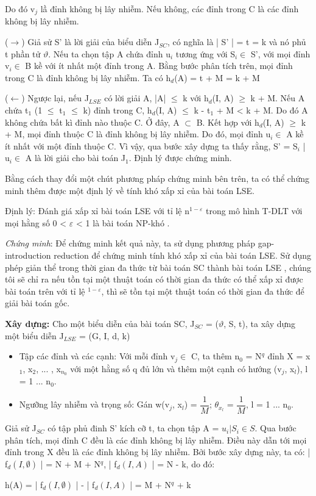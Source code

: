  		Do đó v$_{j}$ lầ đỉnh không bị lây nhiễm. Nếu không, các đỉnh trong C là các đỉnh không bị lây nhiễm.
 		
 		($\rightarrow$) Giả sử S' là lời giải của biểu diễn J$_{SC}$, có nghĩa là | S' | = t = k và nó phủ t phần tử $\vartheta$. Nếu ta chọn tập A chứa đỉnh u$_{i}$ tương ứng với S$_{i} \in$ S', với mọi đỉnh v$_{i} \in$ B kề với ít nhất một đỉnh trong A. Bằng bước phân tích trên, mọi đỉnh trong C là đỉnh không bị lây nhiễm. Ta có h$_{d}$(A) = t + M = k + M
 		
 		($\leftarrow$) Ngược lại, nếu J$_{LSE}$ có lời giải A, |A| $\leq$ k với h$_{d}$(I, A) $\geq$ k + M. Nếu A chứa t$_{1}$ (1 $\leq$ t$_{1}$ $\leq$ k) đỉnh trong C, h$_{d}$(I, A) $\leq$ k - t$_{1}$ + M < k + M. Do đó A không chứa bất kì đỉnh nào thuộc C. Ở đây, A $\subset$ B. Kết hợp với h$_{d}$(I, A) $\geq$ k + M, mọi đỉnh thuộc C là đỉnh không bị lây nhiễm. Do đó, mọi đỉnh u$_{i} \in$ A kề ít nhất với một đỉnh thuộc C. Vì vậy, qua bước xây dựng ta thấy rằng, S' = { S$_{i}$ | u$_{i} \in$ A } là lời giải cho bài toán J$_{1}$. Định lý được chứng minh.
 		
 		Bằng cách thay đổi một chút phương pháp chứng minh bên trên, ta có thể chứng minh thêm được một định lý về tính khó xấp xỉ của bài toán LSE.
 		
 		Định lý: Đánh giá xấp xỉ bài toán LSE với tỉ lệ n$^{1 - \varepsilon}$ trong mô hình T-DLT với mọi hằng số 0 < $\varepsilon$ < 1 là bài toán NP-khó .
 		
 		{\itshape Chứng minh}: Để chứng minh kết quả này, ta sử dụng phương pháp gap-introduction reduction \cite{vijay38} để chứng minh tính khó xấp xỉ của bài toán LSE. Sử dụng phép giản thể trong thời gian đa thức từ bài toán SC thành bài toán LSE , chúng tôi sẽ chỉ ra nếu tồn tại một thuật toán có thời gian đa thức có thể xấp xỉ được bài toán trên với tỉ lệ $^{1 - \varepsilon}$, thì sẽ tồn tại một thuật toán có thời gian đa thức để giải bài toán gốc.
 		
 		{\bfseries Xây dựng:} Cho một biểu diễn của bài toán SC, J$_{SC}$ = ($\vartheta$, S, t), ta xây dựng một biểu diễn J$_{LSE}$ = (G, I, d, k) 
 		\begin {itemize}
 			\item Tập các đỉnh và các cạnh: Với mỗi đỉnh v$_{j} \in$ C, ta thêm n$_{0}$ = N$^{q}$ đỉnh X = { x$_{1}$, x$_{2}$, ... , x$_{n_{0}}$} với một hằng số q đủ lớn và thêm một cạnh có hướng (v$_{j}$, x$_{l}$), l = 1 ... n$_{0}$.
 		
 			\item Ngưỡng lây nhiễm và trọng số: Gán w(v$_{j}$, x$_{l}$) = $\dfrac{1}{M}$; $\theta_{x_{l}}$ = $\dfrac{1}{M}$, l = 1 ... n$_{0}$.\\
 		\end {itemize}
 		Giả sử J$_{SC}$ có tập phủ đinh S' kích cỡ t, ta chọn tập A = ${{u_{i} | S_{i} \in S}}$. Qua bước phân tích, mọi đỉnh C đều là các đỉnh không bị lây nhiễm. Điều này dẫn tới mọi đỉnh trong X đều là các đỉnh không bị lây nhiễm. Bởi bước xây dựng này, ta có: | f$_{d}(I, \emptyset)$ | = N + M + N$^{q}$, | f$_{d}(I, A)$ | = N - k, do đó: 
 		\begin{center}
 			h(A) = | f$_{d}(I, \emptyset)$ | - | f$_{d}(I, A)$ | = M + N$^{q}$ + k
 		\end{center}
 		
